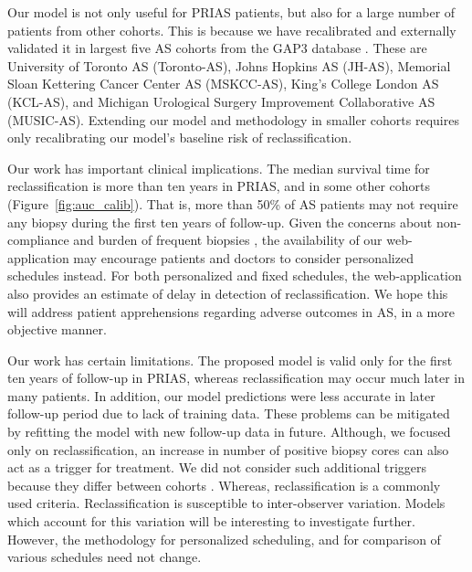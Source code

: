 Our model is not only useful for PRIAS patients, but also for a large number of patients from other cohorts. This is because we have recalibrated and externally validated it in largest five AS cohorts from the GAP3 database \citep{gap3_2018}. These are University of Toronto AS (Toronto-AS), Johns Hopkins AS (JH-AS), Memorial Sloan Kettering Cancer Center AS (MSKCC-AS), King's College London AS (KCL-AS), and Michigan Urological Surgery Improvement Collaborative AS (MUSIC-AS). Extending our model and methodology in smaller cohorts requires only recalibrating our model's baseline risk of reclassification.

Our work has important clinical implications. The median survival time for reclassification is more than ten years in PRIAS, and in some other cohorts (Figure~\ref{fig:auc_calib}). That is, more than 50\% of AS patients may not require any biopsy during the first ten years of follow-up. Given the concerns about non-compliance and burden of frequent biopsies \citep{bokhorst2015compliance}, the availability of our web-application may encourage patients and doctors to consider personalized schedules instead. For both personalized and fixed schedules, the web-application also provides an estimate of delay in detection of reclassification. We hope this will address patient apprehensions regarding adverse outcomes in AS, in a more objective manner. 

Our work has certain limitations. The proposed model is valid only for the first ten years of follow-up in PRIAS, whereas reclassification may occur much later in many patients. In addition, our model predictions were less accurate in later follow-up period due to lack of training data. These problems can be mitigated by refitting the model with new follow-up data in future. Although, we focused only on reclassification, an increase in number of positive biopsy cores can also act as a trigger for treatment. We did not consider such additional triggers because they differ between cohorts \citep{nieboer2018active}. Whereas, reclassification is a commonly used criteria. Reclassification is susceptible to inter-observer variation. Models which account for this variation \citep{coley2017prediction,balasubramanian2003estimation} will be interesting to investigate further. However, the methodology for personalized scheduling, and for comparison of various schedules need not change.